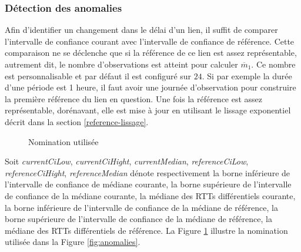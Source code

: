 \subsubsection{Détection des anomalies}
Afin d'identifier un changement dans le délai d'un lien, il suffit de comparer l'intervalle de confiance courant avec l'intervalle de 
confiance de référence. Cette comparaison ne se déclenche que si la référence de ce lien est assez représentable, autrement dit, le nombre d'observations est atteint pour calculer $\overline{m}_{1}$. Ce nombre est personnalisable et par défaut il est configuré sur $ 24 $. Si par exemple la durée d'une période est 1 heure, il faut avoir une journée d'observation pour construire la première référence du lien en question. Une fois la référence est  assez représentable, dorénavant,  elle est mise à jour en utilisant  le lissage exponentiel décrit dans la section \ref{reference-lissage}.
\begin{figure}
	\captionsetup{justification=centering}
	
	\resizebox{.4\textwidth}{!}{
		
	}
	\caption{Nomination utilisée}
	\label{fig:explainCis}
\end{figure}


Soit \textit{currentCiLow}, \textit{currentCiHight}, \textit{currentMedian}, \textit{referenceCiLow}, \textit{referenceCiHight}, \textit{referenceMedian} dénote respectivement la borne inférieure de l'intervalle de confiance de médiane courante, la borne supérieure de l'intervalle de confiance de la médiane courante, la médiane des RTTs différentiels courante, la borne inférieure de l'intervalle de confiance de la médiane de référence, la borne supérieure de l'intervalle de confiance de la médiane de référence, la médiane des RTTs différentiels de référence. La Figure 	\ref{fig:explainCis} illustre la nomination utilisée dans la Figure \ref{fig:anomalies}.

